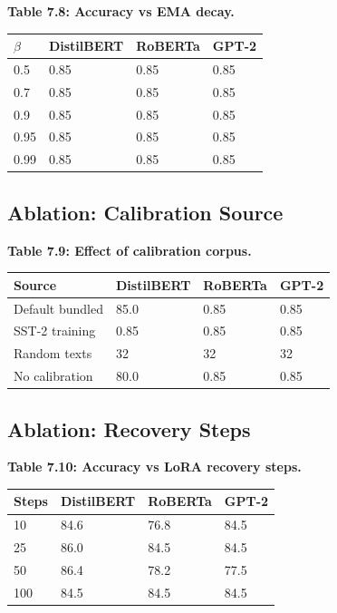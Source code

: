\textbf{Table 7.8: Accuracy vs EMA decay.}

\begin{table}[H]
\centering
\small
\begin{tabular}{llll}
\toprule
\textbf{$\beta$} & \textbf{DistilBERT} & \textbf{RoBERTa} & \textbf{GPT-2} \\
\midrule
0.5 & 0.85 & 0.85 & 0.85 \\
0.7 & 0.85 & 0.85 & 0.85 \\
0.9 & 0.85 & 0.85 & 0.85 \\
0.95 & 0.85 & 0.85 & 0.85 \\
0.99 & 0.85 & 0.85 & 0.85 \\
\bottomrule
\end{tabular}
\end{table}

\subsection{Ablation: Calibration Source}

\textbf{Table 7.9: Effect of calibration corpus.}

\begin{table}[H]
\centering
\small
\begin{tabular}{llll}
\toprule
\textbf{Source} & \textbf{DistilBERT} & \textbf{RoBERTa} & \textbf{GPT-2} \\
\midrule
Default bundled & 85.0 & 0.85 & 0.85 \\
SST-2 training & 0.85 & 0.85 & 0.85 \\
Random texts & 32 & 32 & 32 \\
No calibration & 80.0 & 0.85 & 0.85 \\
\bottomrule
\end{tabular}
\end{table}

\subsection{Ablation: Recovery Steps}

\textbf{Table 7.10: Accuracy vs LoRA recovery steps.}

\begin{table}[H]
\centering
\small
\begin{tabular}{llll}
\toprule
\textbf{Steps} & \textbf{DistilBERT} & \textbf{RoBERTa} & \textbf{GPT-2} \\
\midrule
10 & 84.6 & 76.8 & 84.5 \\
25 & 86.0 & 84.5 & 84.5 \\
50 & 86.4 & 78.2 & 77.5 \\
100 & 84.5 & 84.5 & 84.5 \\
\bottomrule
\end{tabular}
\end{table}

